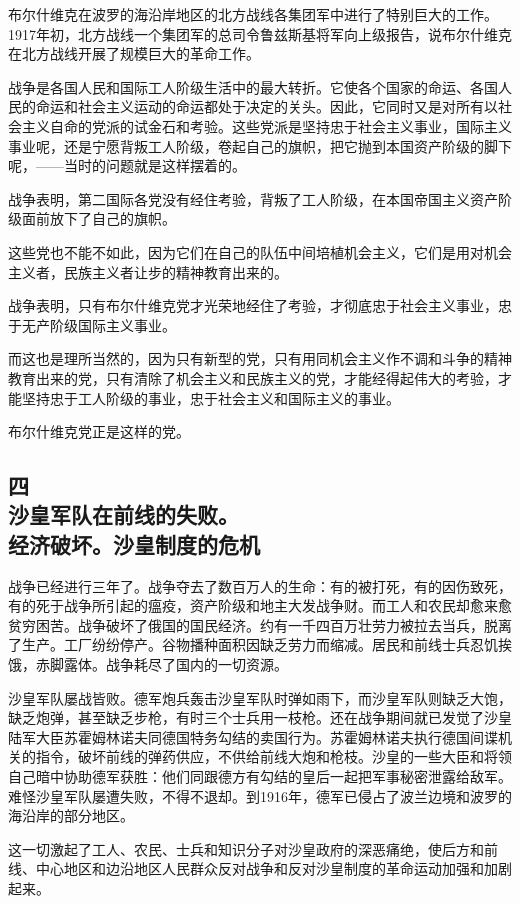布尔什维克在波罗的海沿岸地区的北方战线各集团军中进行了特别巨大的工作。1917年初，北方战线一个集团军的总司令鲁兹斯基将军向上级报告，说布尔什维克在北方战线开展了规模巨大的革命工作。

战争是各国人民和国际工人阶级生活中的最大转折。它使各个国家的命运、各国人民的命运和社会主义运动的命运都处于决定的关头。因此，它同时又是对所有以社会主义自命的党派的试金石和考验。这些党派是坚持忠于社会主义事业，国际主义事业呢，还是宁愿背叛工人阶级，卷起自己的旗帜，把它抛到本国资产阶级的脚下呢，——当时的问题就是这样摆着的。

战争表明，第二国际各党没有经住考验，背叛了工人阶级，在本国帝国主义资产阶级面前放下了自己的旗帜。

这些党也不能不如此，因为它们在自己的队伍中间培植机会主义，它们是用对机会主义者，民族主义者让步的精神教育出来的。

战争表明，只有布尔什维克党才光荣地经住了考验，才彻底忠于社会主义事业，忠于无产阶级国际主义事业。

而这也是理所当然的，因为只有新型的党，只有用同机会主义作不调和斗争的精神教育出来的党，只有清除了机会主义和民族主义的党，才能经得起伟大的考验，才能坚持忠于工人阶级的事业，忠于社会主义和国际主义的事业。

布尔什维克党正是这样的党。


\subsection[四\q 沙皇军队在前线的失败。经济破坏。沙皇制度的危机]{四\\沙皇军队在前线的失败。\\经济破坏。沙皇制度的危机}

战争已经进行三年了。战争夺去了数百万人的生命：有的被打死，有的因伤致死，有的死于战争所引起的瘟疫，资产阶级和地主大发战争财。而工人和农民却愈来愈贫穷困苦。战争破坏了俄国的国民经济。约有一千四百万壮劳力被拉去当兵，脱离了生产。工厂纷纷停产。谷物播种面积因缺乏劳力而缩减。居民和前线士兵忍饥挨饿，赤脚露体。战争耗尽了国内的一切资源。

沙皇军队屡战皆败。德军炮兵轰击沙皇军队时弹如雨下，而沙皇军队则缺乏大饱，缺乏炮弹，甚至缺乏步枪，有时三个士兵用一枝枪。还在战争期间就已发觉了沙皇陆军大臣苏霍姆林诺夫同德国特务勾结的卖国行为。苏霍姆林诺夫执行德国间谍机关的指令，破坏前线的弹药供应，不供给前线大炮和枪枝。沙皇的一些大臣和将领自己暗中协助德军获胜：他们同跟德方有勾结的皇后一起把军事秘密泄露给敌军。难怪沙皇军队屡遭失败，不得不退却。到1916年，德军已侵占了波兰边境和波罗的海沿岸的部分地区。

这一切激起了工人、农民、士兵和知识分子对沙皇政府的深恶痛绝，使后方和前线、中心地区和边沿地区人民群众反对战争和反对沙皇制度的革命运动加强和加剧起来。


